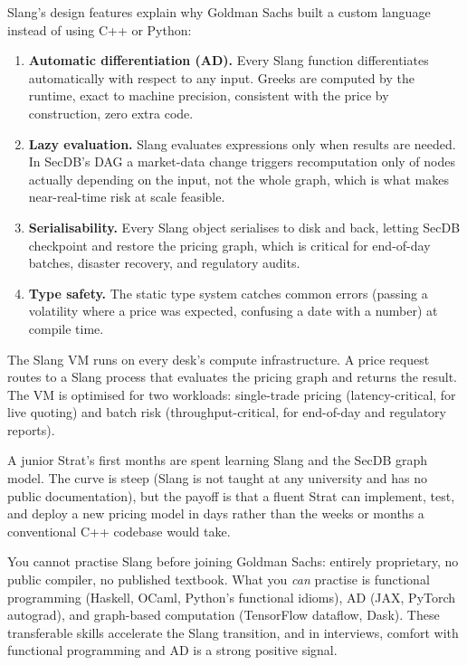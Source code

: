 Slang's design features explain why Goldman Sachs built a custom
language instead of using C++ or Python:

\begin{enumerate}
  \item \textbf{Automatic differentiation (AD).}  Every Slang
    function differentiates automatically with respect to any input.
    Greeks are computed by the runtime, exact to machine precision,
    consistent with the price by construction, zero extra code.
  \item \textbf{Lazy evaluation.}  Slang evaluates expressions only
    when results are needed.  In SecDB's DAG a market-data change
    triggers recomputation only of nodes actually depending on the
    input, not the whole graph, which is what makes near-real-time
    risk at scale feasible.
  \item \textbf{Serialisability.}  Every Slang object serialises to
    disk and back, letting SecDB checkpoint and restore the pricing
    graph, which is critical for end-of-day batches, disaster
    recovery, and regulatory audits.
  \item \textbf{Type safety.}  The static type system catches common
    errors (passing a volatility where a price was expected,
    confusing a date with a number) at compile time.
\end{enumerate}

The Slang VM runs on every desk's compute infrastructure.  A price
request routes to a Slang process that evaluates the pricing graph
and returns the result.  The VM is optimised for two workloads:
single-trade pricing (latency-critical, for live quoting) and batch
risk (throughput-critical, for end-of-day and regulatory reports).

A junior Strat's first months are spent learning Slang and the
SecDB graph model.  The curve is steep (Slang is not taught at
any university and has no public documentation), but the payoff
is that a fluent Strat can implement, test, and deploy a new
pricing model in days rather than the weeks or months a conventional
C++ codebase would take.

\begin{pitfallbox}
You cannot practise Slang before joining Goldman Sachs: entirely
proprietary, no public compiler, no published textbook.  What you
\emph{can} practise is functional programming (Haskell, OCaml,
Python's functional idioms), AD (JAX, PyTorch autograd), and
graph-based computation (TensorFlow dataflow, Dask).  These
transferable skills accelerate the Slang transition, and in
interviews, comfort with functional programming and AD is a strong
positive signal.
\end{pitfallbox}

